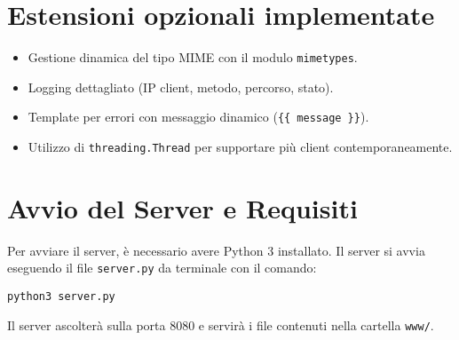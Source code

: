 \documentclass[a4paper,11pt]{article}
\begin{document}
\section*{Estensioni opzionali implementate}
\begin{itemize}
  \item Gestione dinamica del tipo MIME con il modulo \texttt{mimetypes}.
  \item Logging dettagliato (IP client, metodo, percorso, stato).
  \item Template per errori con messaggio dinamico (\texttt{\{\{ message \}\}}).
  \item Utilizzo di \texttt{threading.Thread} per supportare più client contemporaneamente.
\end{itemize}


\section*{Avvio del Server e Requisiti}

Per avviare il server, è necessario avere Python 3 installato.  
Il server si avvia eseguendo il file \texttt{server.py} da terminale con il comando:

\begin{verbatim}
python3 server.py
\end{verbatim}

Il server ascolterà sulla porta 8080 e servirà i file contenuti nella cartella \texttt{www/}.
\end{document}
